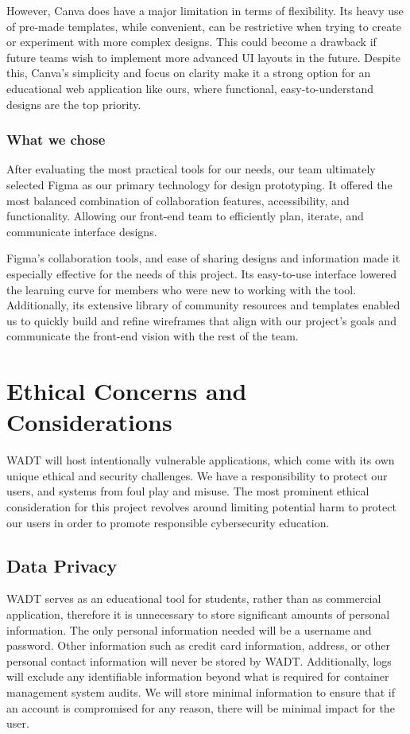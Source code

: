 \documentclass[12pt]{article}
\begin{document}
However, Canva does have a major limitation in terms of flexibility. Its heavy use of pre-made templates, while convenient, can be restrictive when trying to create or experiment with more complex designs. This could become a drawback if future teams wish to implement more advanced UI layouts in the future. Despite this, Canva’s simplicity and focus on clarity make it a strong option for an educational web application like ours, where functional, easy-to-understand designs are the top priority.

\subsubsection{What we chose}
After evaluating the most practical tools for our needs, our team ultimately selected Figma as our primary technology for design prototyping. It offered the most balanced combination of collaboration features, accessibility, and functionality. Allowing our front-end team to efficiently plan, iterate, and communicate interface designs.

Figma’s collaboration tools, and ease of sharing designs and information made it especially effective for the needs of this project. Its easy-to-use interface lowered the learning curve for members who were new to working with the tool. Additionally, its extensive library of community resources and templates enabled us to quickly build and refine wireframes that align with our project’s goals and communicate the front-end vision with the rest of the team.

\section{Ethical Concerns and Considerations}

WADT will host intentionally vulnerable applications, which come with its own unique ethical and security challenges. We have a responsibility to protect our users, and systems from foul play and misuse. The most prominent ethical consideration for this project revolves around limiting potential harm to protect our users in order to promote responsible cybersecurity education. 

\subsection{Data Privacy}
WADT serves as an educational tool for students, rather than as commercial application, therefore it is unnecessary to store significant amounts of personal information. The only personal information needed will be a username and password. Other information such as credit card information, address, or other personal contact information will never be stored by WADT. Additionally, logs will exclude any identifiable information beyond what is required for container management system audits. We will store minimal information to ensure that if an account is compromised for any reason, there will be minimal impact for the user. 
\end{document}
